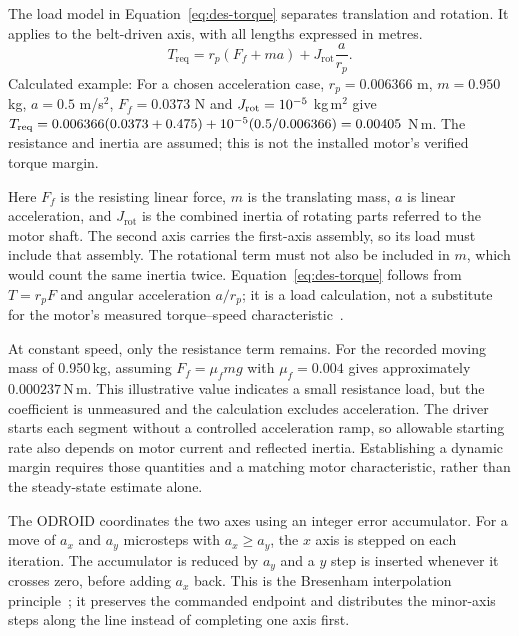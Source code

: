 The load model in Equation~\ref{eq:des-torque} separates translation and rotation. It applies to the belt-driven axis, with all lengths expressed in metres.
\cite[hardware clarifications]{brauneevidence2026}
\begin{equation}
T_{\mathrm{req}}=r_p(F_f+ma)+J_{\mathrm{rot}}\frac{a}{r_p}.
\label{eq:des-torque}
\end{equation}
Calculated example: For a chosen acceleration case, $r_p=0.006366$ m, $m=0.950$ kg, $a=0.5$ m/s$^2$, $F_f=0.0373$ N and $J_{\rm rot}=10^{-5}$ kg\,m$^2$ give $T_{\rm req}=0.006366(0.0373+0.475)+10^{-5}(0.5/0.006366)=0.00405$ N\,m. The resistance and inertia are assumed; this is not the installed motor's verified torque margin. \cite[hardware clarifications]{brauneevidence2026}

Here $F_f$ is the resisting linear force, $m$ is the translating mass, $a$ is linear acceleration, and $J_{\mathrm{rot}}$ is the combined inertia of rotating parts referred to the motor shaft. The second axis carries the first-axis assembly, so its load must include that assembly. The rotational term must not also be included in $m$, which would count the same inertia twice. Equation~\ref{eq:des-torque} follows from $T=r_pF$ and angular acceleration $a/r_p$; it is a load calculation, not a substitute for the motor's measured torque--speed characteristic~\cite[page to verify]{acarnley2002}.~\cite[hardware clarifications; reproduce.py]{brauneevidence2026,braunepipeline2026}

At constant speed, only the resistance term remains. For the recorded moving mass of 0.950\,kg, assuming $F_f=\mu_fmg$ with $\mu_f=0.004$ gives approximately $0.000237$\,N\,m. This illustrative value indicates a small resistance load, but the coefficient is unmeasured and the calculation excludes acceleration. The driver starts each segment without a controlled acceleration ramp, so allowable starting rate also depends on motor current and reflected inertia. Establishing a dynamic margin requires those quantities and a matching motor characteristic, rather than the steady-state estimate alone.~\cite[hardware clarifications; reproduce.py]{brauneevidence2026,braunepipeline2026}

The ODROID coordinates the two axes using an integer error accumulator. For a move of $a_x$ and $a_y$ microsteps with $a_x\geq a_y$, the $x$ axis is stepped on each iteration. The accumulator is reduced by $a_y$ and a $y$ step is inserted whenever it crosses zero, before adding $a_x$ back. This is the Bresenham interpolation principle~\cite[p.~28]{bresenham1965}; it preserves the commanded endpoint and distributes the minor-axis steps along the line instead of completing one axis first.~\cite[hardware clarifications; reproduce.py]{brauneevidence2026,braunepipeline2026}

